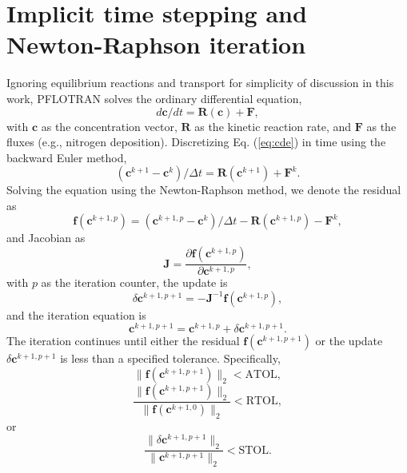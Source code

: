 \documentclass[gmd, manuscript]{copernicus}
\begin{document}
\section{Implicit time stepping and Newton-Raphson iteration}
\label{sec:newton}
Ignoring equilibrium reactions and transport for simplicity of discussion in
this work, PFLOTRAN solves the ordinary differential equation,
\begin{equation}
\label{eq:cde}
{d \mathbf{c}}/{d t} = \mathbf{R}(\mathbf{c}) + \mathbf{F},
\end{equation}
with $\mathbf{c}$ as the concentration vector, $\mathbf{R}$ as the kinetic reaction rate, and $\mathbf{F}$ as the fluxes (e.g., nitrogen deposition). 
Discretizing Eq. (\ref{eq:cde}) in time using the backward Euler method, 
\begin{equation}
{(\mathbf{c}^{k+1} - \mathbf{c}^k)}/{\Delta t} = \mathbf{R}(\mathbf{c}^{k+1}) + \mathbf{F}^k.
\label{eq:cdedis}
\end{equation}
Solving the equation  using the Newton-Raphson method, we denote the residual as
\begin{equation}
\mathbf{f}(\mathbf{c}^{k+1,p} )=(\mathbf{c}^{k+1,p}-\mathbf{c}^k)/\Delta t-\mathbf{R}(\mathbf{c}^{k+1,p})-\mathbf{F}^k,
\label{eq:residual}
\end{equation}
and Jacobian as
\begin{equation}
\mathbf{J} = \frac{\partial \mathbf{f}(\mathbf{c}^{k+1,p})}{\partial \mathbf{c}^{k+1,p}},
\label{eq:jacobian}
\end{equation}
with $p$ as the iteration counter, the update is
\begin{equation}
\delta \mathbf{c}^{k+1,p+1}= -\mathbf{J}^{-1} \mathbf{f} (\mathbf{c}^{k+1,p}),
\label{eq:axb}
\end{equation}
and the iteration equation is
\begin{equation}
\mathbf{c}^{k+1,p+1}=\mathbf{c}^{k+1,p}+\delta \mathbf{c}^{k+1,p+1}.
\label{eq:update}
\end{equation}
The iteration continues until either the residual
$\mathbf{f}(\mathbf{c}^{k+1,p+1} )$ or the update $\delta
\mathbf{c}^{k+1,p+1}$ is less than a specified tolerance. Specifically,
\begin{equation}
\|\mathbf{f}(\mathbf{c}^{k+1,p+1} )\|_2 < \text{ATOL},
\label{eq:atol}
\end{equation}
\begin{equation}
\frac{\|\mathbf{f}(\mathbf{c}^{k+1,p+1} )\|_2}{\|\mathbf{f}(\mathbf{c}^{k+1,0} )\|_2} < \text{RTOL},
\label{eq:rtol}
\end{equation}
or
\begin{equation}
\frac{\|\delta \mathbf{c}^{k+1,p+1} \|_2}{\|\mathbf{c}^{k+1,p+1} \|_2} < \text{STOL}.
\label{eq:stol}
\end{equation}
\end{document}
